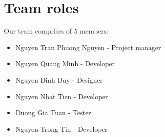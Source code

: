 \chapter{Team roles}
Our team comprises of 5 members:
\begin{itemize}
	\item Nguyen Tran Phuong Nguyen - Project manager
	\item Nguyen Quang Minh - Developer
	\item Nguyen Dinh Duy - Designer
	\item Nguyen Nhat Tien - Developer
	\item Duong Gia Tuan - Tester
	\item Nguyen Trong Tin - Developer
\end{itemize}
